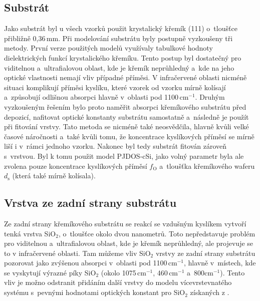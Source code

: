 \subsection{Substrát}
Jako substrát byl u všech vzorků použit krystalický křemík (111) o~tloušťce přibližně 0,36\,mm. Při modelování substrátu byly postupně vyzkoušeny tři metody. První verze použitých modelů využívaly tabulkové hodnoty dielektrických funkcí krystalického kře\-mí\-ku. Tento postup byl dostatečný pro viditelnou a~ultrafialovou oblast, kde je křemík neprůhledný a~kde na jeho optické vlastnosti nemají vliv případné příměsi. V infračervené oblasti nicméně situaci komplikují příměsi kyslíku, které vzorek od vzorku mírně kolísají a~způsobují odlišnou absorpci hlavně v~oblasti pod 1100\,cm$^{-1}$. Druhým vy\-zkoušeným řešením bylo proto naměřit absorpci křemíkového substrátu před depozicí, nafitovat optické konstanty substrátu samostatně a~následně je použít při fitování vrstvy. Tato metoda se nicméně také neosvědčila, hlavně kvůli velké časové náročnosti a~také kvůli tomu, že koncentrace kyslíkových příměsí se mírně liší i v~rámci jednoho vzorku.
Nakonec byl tedy substrát fitován zároveň s~vrstvou. Byl k tomu použit model PJDOS-cSi, jako volný parametr byla ale zvolena pouze koncentrace kyslíkových příměsí $f_\mathrm{O}$ a~tloušťka křemíkového waferu $d_\mathrm{s}$ (která také mírně kolísala).  

\subsection{Vrstva ze zadní strany substrátu}
Ze zadní strany křemíkového substrátu se reakcí se vzdušným kyslíkem vytvoří tenká vrstva SiO$_2$, o~tloušťce okolo dvou nanometrů. Toto nepředstavuje problém pro viditelnou a~ultrafialovou oblast, kde je křemík neprůhledný, ale projevuje se to v infračervené oblasti. Tam můžeme vliv SiO$_2$ vrstvy ze zadní strany substrátu pozorovat jako zvýšenou absorpci v~oblasti pod 1100\,cm$^{-1}$, hlavně v~místech, kde se vyskytují výrazné píky SiO$_2$ (okolo 1075\,cm$^{-1}$, 460\,cm$^{-1}$ a~800cm$^{-1}$). 
Tento vliv je možno odstranit přidáním další vrstvy do modelu vícevrstevnatého systému s~pevnými hodnotami optických konstant pro SiO$_2$ získaných z \cite{Palik1985}.

\cleardoublepage
